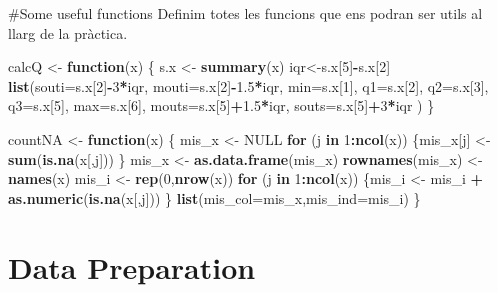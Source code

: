 \documentclass[12pt,]{article}
\newenvironment{Shaded}{\begin{snugshade}}{\end{snugshade}}
\newcommand{\ControlFlowTok}[1]{\textcolor[rgb]{0.13,0.29,0.53}{\textbf{#1}}}
\newcommand{\DataTypeTok}[1]{\textcolor[rgb]{0.13,0.29,0.53}{#1}}
\newcommand{\DecValTok}[1]{\textcolor[rgb]{0.00,0.00,0.81}{#1}}
\newcommand{\FloatTok}[1]{\textcolor[rgb]{0.00,0.00,0.81}{#1}}
\newcommand{\KeywordTok}[1]{\textcolor[rgb]{0.13,0.29,0.53}{\textbf{#1}}}
\newcommand{\NormalTok}[1]{#1}
\newcommand{\OperatorTok}[1]{\textcolor[rgb]{0.81,0.36,0.00}{\textbf{#1}}}
\newcommand{\OtherTok}[1]{\textcolor[rgb]{0.56,0.35,0.01}{#1}}
\newcommand{\StringTok}[1]{\textcolor[rgb]{0.31,0.60,0.02}{#1}}
\begin{document}
\#Some useful functions Definim totes les funcions que ens podran ser
utils al llarg de la pràctica.

\begin{Shaded}
\begin{Highlighting}[]
\NormalTok{calcQ <-}\StringTok{ }\ControlFlowTok{function}\NormalTok{(x) \{}
\NormalTok{  s.x <-}\StringTok{ }\KeywordTok{summary}\NormalTok{(x)}
\NormalTok{  iqr<-s.x[}\DecValTok{5}\NormalTok{]}\OperatorTok{-}\NormalTok{s.x[}\DecValTok{2}\NormalTok{]}
  \KeywordTok{list}\NormalTok{(}\DataTypeTok{souti=}\NormalTok{s.x[}\DecValTok{2}\NormalTok{]}\OperatorTok{-}\DecValTok{3}\OperatorTok{*}\NormalTok{iqr, }\DataTypeTok{mouti=}\NormalTok{s.x[}\DecValTok{2}\NormalTok{]}\OperatorTok{-}\FloatTok{1.5}\OperatorTok{*}\NormalTok{iqr, }\DataTypeTok{min=}\NormalTok{s.x[}\DecValTok{1}\NormalTok{], }\DataTypeTok{q1=}\NormalTok{s.x[}\DecValTok{2}\NormalTok{], }\DataTypeTok{q2=}\NormalTok{s.x[}\DecValTok{3}\NormalTok{], }
       \DataTypeTok{q3=}\NormalTok{s.x[}\DecValTok{5}\NormalTok{], }\DataTypeTok{max=}\NormalTok{s.x[}\DecValTok{6}\NormalTok{], }\DataTypeTok{mouts=}\NormalTok{s.x[}\DecValTok{5}\NormalTok{]}\OperatorTok{+}\FloatTok{1.5}\OperatorTok{*}\NormalTok{iqr, }\DataTypeTok{souts=}\NormalTok{s.x[}\DecValTok{5}\NormalTok{]}\OperatorTok{+}\DecValTok{3}\OperatorTok{*}\NormalTok{iqr ) \}}

\NormalTok{countNA <-}\StringTok{ }\ControlFlowTok{function}\NormalTok{(x) \{}
\NormalTok{  mis_x <-}\StringTok{ }\OtherTok{NULL}
  \ControlFlowTok{for}\NormalTok{ (j }\ControlFlowTok{in} \DecValTok{1}\OperatorTok{:}\KeywordTok{ncol}\NormalTok{(x)) \{mis_x[j] <-}\StringTok{ }\KeywordTok{sum}\NormalTok{(}\KeywordTok{is.na}\NormalTok{(x[,j])) \}}
\NormalTok{  mis_x <-}\StringTok{ }\KeywordTok{as.data.frame}\NormalTok{(mis_x)}
  \KeywordTok{rownames}\NormalTok{(mis_x) <-}\StringTok{ }\KeywordTok{names}\NormalTok{(x)}
\NormalTok{  mis_i <-}\StringTok{ }\KeywordTok{rep}\NormalTok{(}\DecValTok{0}\NormalTok{,}\KeywordTok{nrow}\NormalTok{(x))}
  \ControlFlowTok{for}\NormalTok{ (j }\ControlFlowTok{in} \DecValTok{1}\OperatorTok{:}\KeywordTok{ncol}\NormalTok{(x)) \{mis_i <-}\StringTok{ }\NormalTok{mis_i }\OperatorTok{+}\StringTok{ }\KeywordTok{as.numeric}\NormalTok{(}\KeywordTok{is.na}\NormalTok{(x[,j])) \}}
  \KeywordTok{list}\NormalTok{(}\DataTypeTok{mis_col=}\NormalTok{mis_x,}\DataTypeTok{mis_ind=}\NormalTok{mis_i) \}}
\end{Highlighting}
\end{Shaded}

\hypertarget{data-preparation}{%
\section{Data Preparation}\label{data-preparation}}
\end{document}

